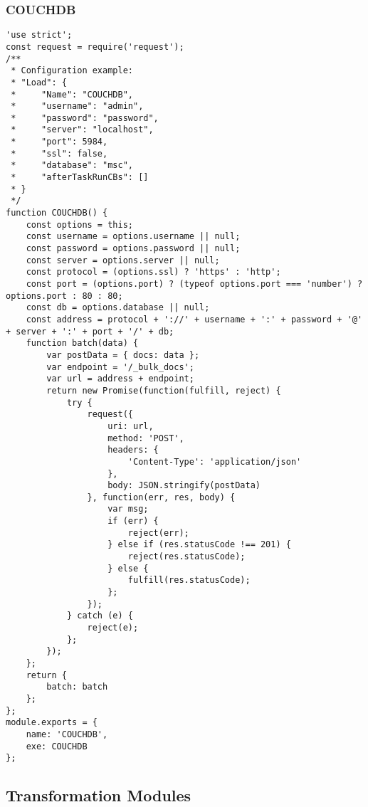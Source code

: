 \subsubsection{COUCHDB}
\label{netl-load-couchdb}
\begin{verbatim}
'use strict';
const request = require('request');
/**
 * Configuration example:
 * "Load": {
 *     "Name": "COUCHDB",
 *     "username": "admin",
 *     "password": "password",
 *     "server": "localhost",
 *     "port": 5984,
 *     "ssl": false,
 *     "database": "msc",
 *     "afterTaskRunCBs": []
 * }
 */
function COUCHDB() {
    const options = this;
    const username = options.username || null;
    const password = options.password || null;
    const server = options.server || null;
    const protocol = (options.ssl) ? 'https' : 'http';
    const port = (options.port) ? (typeof options.port === 'number') ? options.port : 80 : 80;
    const db = options.database || null;
    const address = protocol + '://' + username + ':' + password + '@' + server + ':' + port + '/' + db;
    function batch(data) {
        var postData = { docs: data };
        var endpoint = '/_bulk_docs';
        var url = address + endpoint;
        return new Promise(function(fulfill, reject) {
            try {
                request({
                    uri: url,
                    method: 'POST',
                    headers: {
                        'Content-Type': 'application/json'
                    },
                    body: JSON.stringify(postData)
                }, function(err, res, body) {
                    var msg;
                    if (err) {
                        reject(err);
                    } else if (res.statusCode !== 201) {
                        reject(res.statusCode);
                    } else {
                        fulfill(res.statusCode);
                    };
                });
            } catch (e) {
                reject(e);
            };
        });
    };
    return {
        batch: batch
    };
};
module.exports = {
    name: 'COUCHDB',
    exe: COUCHDB
};
\end{verbatim}

\subsection{Transformation Modules}
